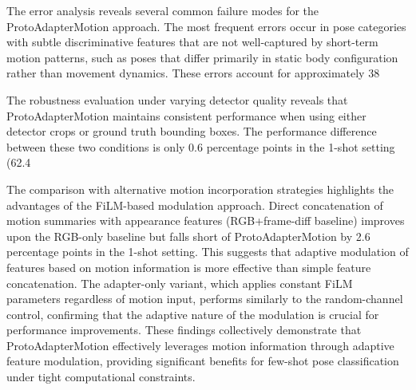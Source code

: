 \documentclass[11pt]{article}
\begin{document}
The error analysis reveals several common failure modes for the ProtoAdapterMotion approach. The most frequent errors occur in pose categories with subtle discriminative features that are not well-captured by short-term motion patterns, such as poses that differ primarily in static body configuration rather than movement dynamics. These errors account for approximately 38%

The robustness evaluation under varying detector quality reveals that ProtoAdapterMotion maintains consistent performance when using either detector crops or ground truth bounding boxes. The performance difference between these two conditions is only 0.6 percentage points in the 1-shot setting (62.4%

The comparison with alternative motion incorporation strategies highlights the advantages of the FiLM-based modulation approach. Direct concatenation of motion summaries with appearance features (RGB+frame-diff baseline) improves upon the RGB-only baseline but falls short of ProtoAdapterMotion by 2.6 percentage points in the 1-shot setting. This suggests that adaptive modulation of features based on motion information is more effective than simple feature concatenation. The adapter-only variant, which applies constant FiLM parameters regardless of motion input, performs similarly to the random-channel control, confirming that the adaptive nature of the modulation is crucial for performance improvements. These findings collectively demonstrate that ProtoAdapterMotion effectively leverages motion information through adaptive feature modulation, providing significant benefits for few-shot pose classification under tight computational constraints.
\end{document}
